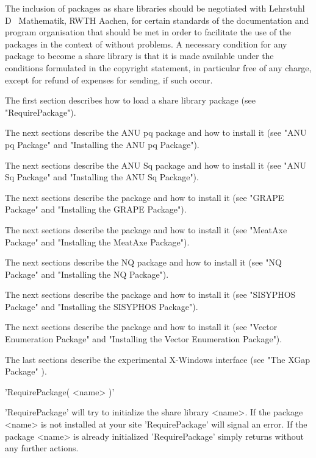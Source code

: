 The inclusion of packages as  {\GAP} share libraries should be negotiated
with Lehrstuhl D \fuer\ Mathematik, RWTH Aachen, for certain standards of
the documentation and program organisation that should be met in order to
facilitate  the  use of the   packages in the  context  of {\GAP} without
problems. A necessary condition for any  package to become a {\GAP} share
library is that it is  made available under  the conditions formulated in
the {\GAP} copyright statement, in particular free  of any charge, except
for refund of expenses for sending, if such occur.

The  first section  describes how to load  a  share  library package (see
"RequirePackage").

The next sections describe the ANU pq package and how to install  it (see
"ANU pq Package" and "Installing the ANU pq Package").

The next sections describe the ANU Sq package and how to install  it (see
"ANU Sq Package" and "Installing the ANU Sq Package").

The next  sections describe the {\GRAPE} package and  how to  install  it
(see "GRAPE Package" and "Installing the GRAPE Package").

The next  sections describe the {\MeatAxe} package and  how to install it
(see "MeatAxe Package" and "Installing the MeatAxe Package").

The next sections describe the NQ package  and how to install it (see "NQ
Package" and "Installing the NQ Package").

The next sections describe  the {\SISYPHOS} package and how to install it
(see "SISYPHOS Package" and "Installing the SISYPHOS Package").

The next sections describe the {\VE} package and  how to install  it (see
"Vector Enumeration Package" and "Installing the Vector Enumeration
Package").

The  last sections describe the experimental  X-Windows interface
(see  "The  XGap  Package" ).


'RequirePackage( <name> )'

'RequirePackage' will try to initialize the  share library <name>. If the
package <name> is not installed at your site 'RequirePackage' will signal
an  error.  If the package <name> is already initialized 'RequirePackage'
simply returns without any further actions.

